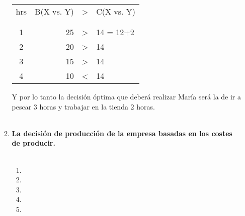 \begin{enumerate}
\begin{enumerate}[\bfseries 2.1]
		\begin{tcolorbox}[colframe=white]
		    \begin{center}
			\begin{tabular}{crcl}
			    hrs&B(X vs. Y)&>&C(X vs. Y)\\\\
			    \hline\\
			       1&25&>&14 = 12+2\\
			       2&20&>&14\\
			       3&15&>&14\\
			       4&10&<&14\\
			\end{tabular}
		    \end{center}
		\end{tcolorbox}

		Y por lo tanto la decisión óptima que deberá realizar María será la de ir a pescar 3 horas y trabajar en la tienda 2 horas.\\\\

	    \item \textbf{La decisión de producción de la empresa basadas en los costes de producir.}\\\\

		\begin{enumerate}[\bfseries a)]

		    \item 

		    \item 

		    \item 

		    \item

		    \item

		\end{enumerate}


	\end{enumerate}

\end{enumerate}
